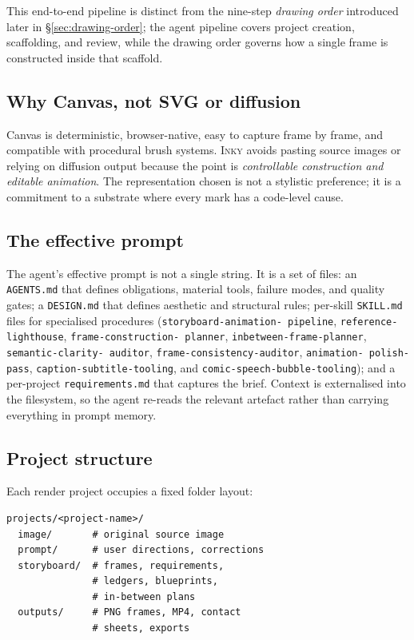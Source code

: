 \documentclass[10pt,twocolumn]{article}
\newcommand{\inky}{\textsc{Inky}}
\begin{document}
This end-to-end pipeline is distinct from the nine-step
\emph{drawing order} introduced later in \S\ref{sec:drawing-order};
the agent pipeline covers project creation, scaffolding, and
review, while the drawing order governs how a single frame is
constructed inside that scaffold.

\subsection{Why Canvas, not SVG or diffusion}

Canvas is deterministic, browser-native, easy to capture frame by
frame, and compatible with procedural brush systems. \inky{} avoids
pasting source images or relying on diffusion output because the
point is \emph{controllable construction and editable animation}. The
representation chosen is not a stylistic preference; it is a
commitment to a substrate where every mark has a code-level cause.

\subsection{The effective prompt}
\label{sec:effective-prompt}

The agent's effective prompt is not a single string. It is a set of
files: an \texttt{AGENTS.md} that defines obligations, material
tools, failure modes, and quality gates; a \texttt{DESIGN.md} that
defines aesthetic and structural rules; per-skill \texttt{SKILL.md}
files for specialised procedures (\texttt{storyboard-animation-%
pipeline}, \texttt{reference-lighthouse}, \texttt{frame-construction-%
planner}, \texttt{inbetween-frame-planner}, \texttt{semantic-clarity-%
auditor}, \texttt{frame-consistency-auditor}, \texttt{animation-%
polish-pass}, \texttt{caption-subtitle-tooling}, and
\texttt{comic-speech-bubble-tooling}); and a per-project
\texttt{requirements.md} that captures the brief. Context is
externalised into the filesystem, so the agent re-reads the relevant
artefact rather than carrying everything in prompt memory.

\subsection{Project structure}

Each render project occupies a fixed folder layout:

\begin{verbatim}
projects/<project-name>/
  image/       # original source image
  prompt/      # user directions, corrections
  storyboard/  # frames, requirements,
               # ledgers, blueprints,
               # in-between plans
  outputs/     # PNG frames, MP4, contact
               # sheets, exports
\end{verbatim}
\end{document}
